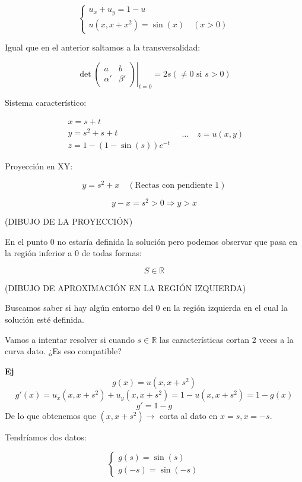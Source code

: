 	\begin{example}{8}

		\[
		\left\{
		\begin{array}{l}
			u_x+ u_y = 1 - u\\
			u(x,x+x^2) = \sin(x) \quad (x>0)
		\end{array}
		\right.
		\]

		Igual que en el anterior saltamos a la transversalidad:


		\[\det \left. \begin{pmatrix}
			a & b \\
			\alpha' & \beta'
		\end{pmatrix} \right|_{t=0} = 2s (\neq 0 \text{ si } s > 0) \]


		Sistema característico:

		\[
		\begin{array}{l}
		x = s+t \\
		y = s^2 + s + t \\
		z = 1 - (1 - \sin(s) )e^{-t}
		\end{array} \quad … \quad z = u(x,y)
		\]

		Proyección en XY:

		\[y = s^2 + x \quad(\text{Rectas con pendiente 1})\]

		\[y-x = s^2 > 0 \Rightarrow y > x\]

		(DIBUJO DE LA PROYECCIÓN)

		En el punto 0 no estaría definida la solución pero podemos observar que pasa en la región inferior a 0 de todas formas:

		$$S \in \mathbb{R}$$

		(DIBUJO DE APROXIMACIÓN EN LA REGIÓN IZQUIERDA)

		Buscamos saber si hay algún entorno del 0 en la región izquierda en el cual la solución esté definida.

		Vamos a intentar resolver si cuando $s \in \mathbb{R}$ las características cortan 2 veces a la curva dato. ¿Es eso compatible?

		\textbf{Ej}
		\[g(x) = u(x,x+s^2)\]
		\[g'(x) = u_x (x,x+s^2) + u_y(x,x+s^2) = 1 - u(x,x+s^2) = 1 - g(x)\]
		\[g' = 1-g\]
		De lo que obtenemos que $(x,x+s^2) \rightarrow $ corta al dato en $x=s, x=-s$.

		Tendríamos dos datos:

		\[
		\begin{cases}
		g(s) = \sin(s) \\
		g(-s) = \sin(-s)
		\end{cases}
		\]


\end{example}
